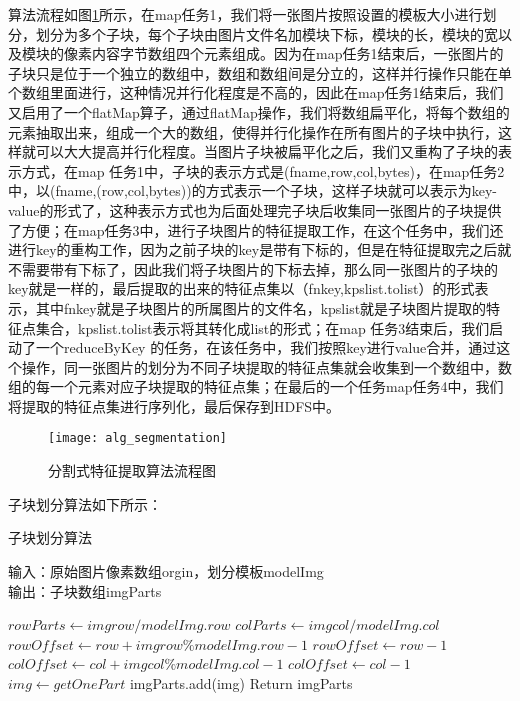算法流程如图\ref{fig:alg_segmentation}所示，在map任务1，我们将一张图片按照设置的模板大小进行划分，划分为多个子块，每个子块由图片文件名加模块下标，模块的长，模块的宽以及模块的像素内容字节数组四个元素组成。因为在map任务1结束后，一张图片的子块只是位于一个独立的数组中，数组和数组间是分立的，这样并行操作只能在单个数组里面进行，这种情况并行化程度是不高的，因此在map任务1结束后，我们又启用了一个flatMap算子，通过flatMap操作，我们将数组扁平化，将每个数组的元素抽取出来，组成一个大的数组，使得并行化操作在所有图片的子块中执行，这样就可以大大提高并行化程度。当图片子块被扁平化之后，我们又重构了子块的表示方式，在map 任务1中，子块的表示方式是(fname,row,col,bytes)，在map任务2 中，以(fname,(row,col,bytes))的方式表示一个子块，这样子块就可以表示为key-value的形式了，这种表示方式也为后面处理完子块后收集同一张图片的子块提供了方便；在map任务3中，进行子块图片的特征提取工作，在这个任务中，我们还进行key的重构工作，因为之前子块的key是带有下标的，但是在特征提取完之后就不需要带有下标了，因此我们将子块图片的下标去掉，那么同一张图片的子块的key就是一样的，最后提取的出来的特征点集以（fnkey,kpslist.tolist）的形式表示，其中fnkey就是子块图片的所属图片的文件名，kpslist就是子块图片提取的特征点集合，kpslist.tolist表示将其转化成list的形式；在map 任务3结束后，我们启动了一个reduceByKey 的任务，在该任务中，我们按照key进行value合并，通过这个操作，同一张图片的划分为不同子块提取的特征点集就会收集到一个数组中，数组的每一个元素对应子块提取的特征点集；在最后的一个任务map任务4中，我们将提取的特征点集进行序列化，最后保存到HDFS中。
\begin{figure}[htp]
\centering
\texttt{[image: alg\_segmentation]}
\caption{分割式特征提取算法流程图}
\label{fig:alg_segmentation}
\end{figure}

子块划分算法如下所示：
\begin{algorithm}[htbp]
  \caption{子块划分算法}
  \label{algDiveModel}
  输入：原始图片像素数组orgin，划分模板modelImg\\
  输出：子块数组imgParts
  \begin{algorithmic}[1]
    \STATE $rowParts\leftarrow imgrow/modelImg.row$
    \STATE $colParts\leftarrow imgcol/modelImg.col$
        \STATE $rowOffset\leftarrow row + imgrow\%modelImg.row-1$
    \ELSE
        \STATE $rowOffset\leftarrow row - 1$
    \ENDIF
        \STATE $colOffset\leftarrow col + imgcol\%modelImg.col-1$
    \ELSE
        \STATE $colOffset\leftarrow col - 1$
    \ENDIF
    \STATE $img\leftarrow getOnePart$
    \STATE imgParts.add(img)
    \ENDFOR
    \ENDFOR
    \STATE Return imgParts
  \end{algorithmic}
\end{algorithm}

